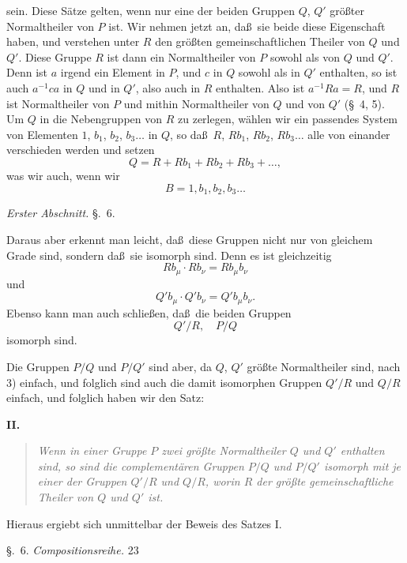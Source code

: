 \documentclass[12pt,a4paper]{book}
\begin{document}
sein. Diese S\"atze gelten, wenn nur eine der beiden Gruppen $Q$, $Q'$ gr\"o\ss ter Normaltheiler von $P$ ist. Wir nehmen jetzt an, da\ss\ sie beide diese Eigenschaft haben, und verstehen unter $R$ den gr\"o\ss ten gemeinschaftlichen Theiler von $Q$ und $Q'$. Diese Gruppe $R$ ist dann ein Normaltheiler von $P$ sowohl als von $Q$ und $Q'$. Denn ist $a$ irgend ein Element in $P$, und $c$ in $Q$ sowohl als in $Q'$ enthalten, so ist auch $a^{-1}ca$ in $Q$ und in $Q'$, also auch in $R$ enthalten. Also ist $a^{-1}Ra = R$, und $R$ ist Normaltheiler von $P$ und mithin Normaltheiler von $Q$ und von $Q'$ (\S~4, 5). Um $Q$ in die Nebengruppen von $R$ zu zerlegen, w\"ahlen wir ein passendes System von Elementen $1$, $b_1$, $b_2$, $b_3 \ldots$ in $Q$, so da\ss\ $R$, $Rb_1$, $Rb_2$, $Rb_3 \ldots$ alle von einander verschieden werden und setzen
\[Q = R + Rb_1 + Rb_2 + Rb_3 + \ldots,\]
was wir auch, wenn wir
\[B = 1, b_1, b_2, b_3 \ldots\]

\newpage
{} \hfill \textit{Erster Abschnitt.} \hfill \S.~6.

\vspace{0.3cm}

Daraus aber erkennt man leicht, da\ss\ diese Gruppen nicht nur von gleichem Grade sind, sondern da\ss\ sie isomorph sind. Denn es ist gleichzeitig
\[Rb_\mu \cdot Rb_\nu = Rb_\mu b_\nu\]
und
\[Q'b_\mu \cdot Q'b_\nu = Q'b_\mu b_\nu.\]
Ebenso kann man auch schlie\ss en, da\ss\ die beiden Gruppen
\[Q'/R,\quad P/Q\]
isomorph sind.

Die Gruppen $P/Q$ und $P/Q'$ sind aber, da $Q$, $Q'$ gr\"o\ss te Normaltheiler sind, nach 3) einfach, und folglich sind auch die damit isomorphen Gruppen $Q'/R$ und $Q/R$ einfach, und folglich haben wir den Satz:

\begin{center}
\textbf{II.}
\end{center}

\vspace{-0.2cm}
\begin{quote}
\textit{Wenn in einer Gruppe $P$ zwei gr\"o\ss te Normaltheiler $Q$ und $Q'$ enthalten sind, so sind die complement\"aren Gruppen $P/Q$ und $P/Q'$ isomorph mit je einer der Gruppen $Q'/R$ und $Q/R$, worin $R$ der gr\"o\ss te gemeinschaftliche Theiler von $Q$ und $Q'$ ist.}
\end{quote}

Hieraus ergiebt sich unmittelbar der Beweis des Satzes I.

\newpage
\noindent\S.~6. \hfill \textit{Compositionsreihe.} \hfill 23
\end{document}

